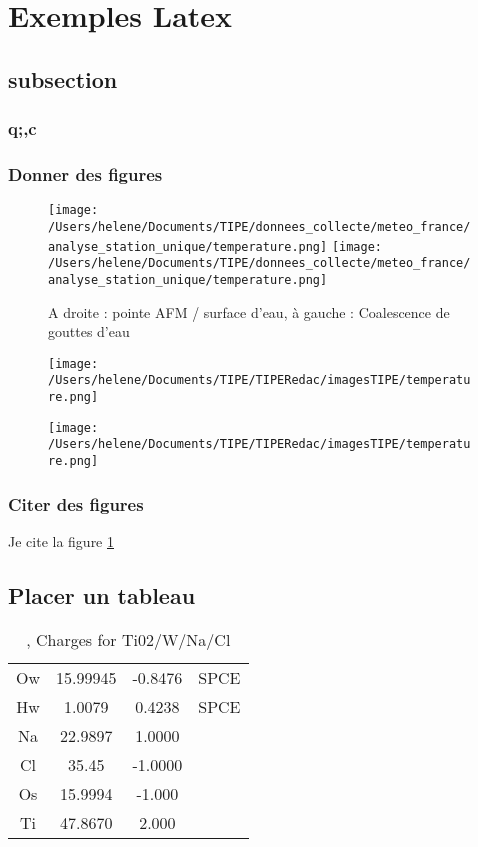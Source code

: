 \documentclass[11pt,a4paper]{article}
\begin{document}
\section{Exemples Latex}
\subsection{subsection}
\subsubsection{q;,c}
\subsubsection{Donner des figures}
\begin{figure}
\centering
\texttt{[image: /Users/helene/Documents/TIPE/donnees\_collecte/meteo\_france/analyse\_station\_unique/temperature.png]}\quad
\texttt{[image: /Users/helene/Documents/TIPE/donnees\_collecte/meteo\_france/analyse\_station\_unique/temperature.png]}
\caption{\label{fig:190101Lolita} A droite : pointe AFM / surface d'eau, à gauche :  Coalescence de gouttes d'eau }
\end{figure}
\begin{figure}
  \texttt{[image: /Users/helene/Documents/TIPE/TIPERedac/imagesTIPE/temperature.png]}\quad
\end{figure}
\begin{figure}
  \texttt{[image: /Users/helene/Documents/TIPE/TIPERedac/imagesTIPE/temperature.png]}\quad
\end{figure}

\subsubsection{Citer des figures}
Je cite la figure \ref{fig:190101Lolita}
\subsection{Placer un tableau}
\begin{table}[ht]
\begin{tabular}{cccc}\hline
\hline
Ow& 15.99945& -0.8476&SPCE\\
Hw&  1.0079 &  0.4238&SPCE\\
Na& 22.9897 &  1.0000&\\         
Cl& 35.45   & -1.0000&\\
Os& 15.9994 & -1.000 &\\   
Ti& 47.8670 &  2.000 &\\  
\hline 
\end{tabular}                     
\caption{\label{MonTableau}, Charges for Ti02/W/Na/Cl}
\end{table}
\end{document}
